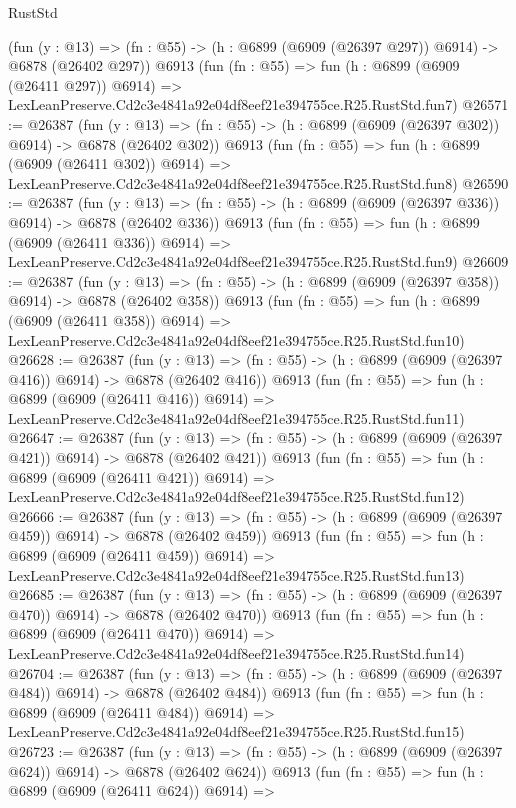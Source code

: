 \begin{lexlean}{RustStd}
\begin{coremodule}
    (fun (y : @13) => (fn : @55) -> (h : @6899 (@6909 (@26397 @297)) @6914) -> @6878 (@26402 @297))
    @6913
    (fun (fn : @55) =>
    fun (h : @6899 (@6909 (@26411 @297)) @6914) =>
    LexLeanPreserve.Cd2c3e4841a92e04df8eef21e394755ce.R25.RustStd.fun7)
@26571 := @26387
    (fun (y : @13) => (fn : @55) -> (h : @6899 (@6909 (@26397 @302)) @6914) -> @6878 (@26402 @302))
    @6913
    (fun (fn : @55) =>
    fun (h : @6899 (@6909 (@26411 @302)) @6914) =>
    LexLeanPreserve.Cd2c3e4841a92e04df8eef21e394755ce.R25.RustStd.fun8)
@26590 := @26387
    (fun (y : @13) => (fn : @55) -> (h : @6899 (@6909 (@26397 @336)) @6914) -> @6878 (@26402 @336))
    @6913
    (fun (fn : @55) =>
    fun (h : @6899 (@6909 (@26411 @336)) @6914) =>
    LexLeanPreserve.Cd2c3e4841a92e04df8eef21e394755ce.R25.RustStd.fun9)
@26609 := @26387
    (fun (y : @13) => (fn : @55) -> (h : @6899 (@6909 (@26397 @358)) @6914) -> @6878 (@26402 @358))
    @6913
    (fun (fn : @55) =>
    fun (h : @6899 (@6909 (@26411 @358)) @6914) =>
    LexLeanPreserve.Cd2c3e4841a92e04df8eef21e394755ce.R25.RustStd.fun10)
@26628 := @26387
    (fun (y : @13) => (fn : @55) -> (h : @6899 (@6909 (@26397 @416)) @6914) -> @6878 (@26402 @416))
    @6913
    (fun (fn : @55) =>
    fun (h : @6899 (@6909 (@26411 @416)) @6914) =>
    LexLeanPreserve.Cd2c3e4841a92e04df8eef21e394755ce.R25.RustStd.fun11)
@26647 := @26387
    (fun (y : @13) => (fn : @55) -> (h : @6899 (@6909 (@26397 @421)) @6914) -> @6878 (@26402 @421))
    @6913
    (fun (fn : @55) =>
    fun (h : @6899 (@6909 (@26411 @421)) @6914) =>
    LexLeanPreserve.Cd2c3e4841a92e04df8eef21e394755ce.R25.RustStd.fun12)
@26666 := @26387
    (fun (y : @13) => (fn : @55) -> (h : @6899 (@6909 (@26397 @459)) @6914) -> @6878 (@26402 @459))
    @6913
    (fun (fn : @55) =>
    fun (h : @6899 (@6909 (@26411 @459)) @6914) =>
    LexLeanPreserve.Cd2c3e4841a92e04df8eef21e394755ce.R25.RustStd.fun13)
@26685 := @26387
    (fun (y : @13) => (fn : @55) -> (h : @6899 (@6909 (@26397 @470)) @6914) -> @6878 (@26402 @470))
    @6913
    (fun (fn : @55) =>
    fun (h : @6899 (@6909 (@26411 @470)) @6914) =>
    LexLeanPreserve.Cd2c3e4841a92e04df8eef21e394755ce.R25.RustStd.fun14)
@26704 := @26387
    (fun (y : @13) => (fn : @55) -> (h : @6899 (@6909 (@26397 @484)) @6914) -> @6878 (@26402 @484))
    @6913
    (fun (fn : @55) =>
    fun (h : @6899 (@6909 (@26411 @484)) @6914) =>
    LexLeanPreserve.Cd2c3e4841a92e04df8eef21e394755ce.R25.RustStd.fun15)
@26723 := @26387
    (fun (y : @13) => (fn : @55) -> (h : @6899 (@6909 (@26397 @624)) @6914) -> @6878 (@26402 @624))
    @6913
    (fun (fn : @55) =>
    fun (h : @6899 (@6909 (@26411 @624)) @6914) =>

\end{coremodule}
\end{lexlean}
